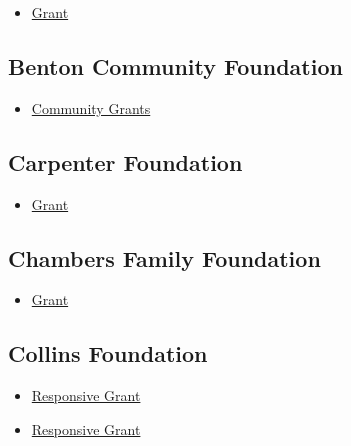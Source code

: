 \documentclass[
  letterpaper,
  DIV=11,
  numbers=noendperiod]{scrreprt}
\providecommand{\tightlist}{%
  \setlength{\itemsep}{0pt}\setlength{\parskip}{0pt}}\usepackage{longtable,booktabs,array}
\begin{document}
\begin{itemize}
\tightlist
\item
  \href{https://www.benbcheneyfoundation.org/}{Grant}
\end{itemize}

\subsection{Benton Community
Foundation}\label{benton-community-foundation}

\begin{itemize}
\tightlist
\item
  \href{https://bcfgives.org/wp-content/uploads/2024/02/2023-Full-Grant-History.pdf}{Community
  Grants}
\end{itemize}

\subsection{Carpenter Foundation}\label{carpenter-foundation}

\begin{itemize}
\tightlist
\item
  \href{http://carpenter-foundation.org/}{Grant}
\end{itemize}

\subsection{Chambers Family
Foundation}\label{chambers-family-foundation}

\begin{itemize}
\tightlist
\item
  \href{https://www.chambersfamilyfoundation.com/submissions}{Grant}
\end{itemize}

\subsection{Collins Foundation}\label{collins-foundation}

\begin{itemize}
\tightlist
\item
  \href{https://www.collinsfoundation.org/responsive-grantmaking-submission-guidelines}{Responsive
  Grant}
\item
  \href{https://www.collinsfoundation.org/responsive-grantmaking-submission-guidelines/frequently-asked-questions}{Responsive
  Grant}
\end{itemize}
\end{document}
